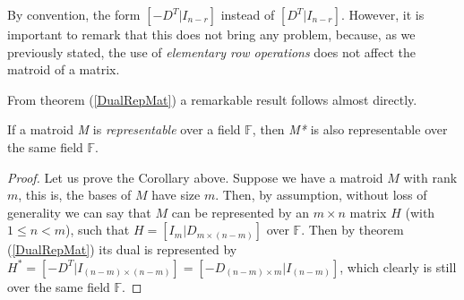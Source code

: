 By convention, the form $[-D^T |I_{n-r}]$ instead of $[D^T |I_{n-r}]$. However, it is important to remark that this does not bring any problem, because, as we previously stated, the use of \textit{elementary row operations} does not affect the matroid of a matrix. 

From theorem (\ref{DualRepMat}) a remarkable result follows almost directly. 

\begin{corollary} \label{corollaryrepdual}
    If a matroid \textit{M} is \textit{representable} over a field $\mathbb{F}$, then \textit{M*} is also representable over the same field $\mathbb{F}$.
\end{corollary}

\begin{proof}
    Let us prove the Corollary above. Suppose we have a matroid $M$ with rank $m$, this is, the bases of $M$ have size $m$. Then, by assumption, without loss of generality we can say that $M$ can be represented by an $m \times n$ matrix $H$ (with $1\leq n < m$), such that $H=[I_{m}|D_{m \times (n-m)}]$ over $\mathbb{F}$. Then by theorem (\ref{DualRepMat}) its dual is represented by $H^*=[-D^T|I_{(n-m) \times (n-m)}]=[-D_{(n-m) \times m}|I_{(n-m)}]$, which clearly is still over the same field $\mathbb{F}$.
\end{proof}

